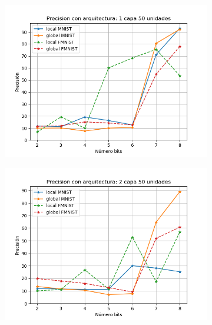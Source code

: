 \begin{figure}[H]
    \begin{subfigure}[H]{0.45\textwidth}
    \includegraphics[width=\textwidth]{imagenes/fa/Precision con arquitectura: 1 capa 50 unidades.png}
    \end{subfigure}
    \begin{subfigure}[H]{0.45\textwidth}
    \includegraphics[width=\textwidth]{imagenes/fa/Precision con arquitectura: 2 capa 50 unidades.png}
    \end{subfigure}
    \begin{subfigure}[H]{0.45\textwidth}

\end{subfigure}
\end{figure}
